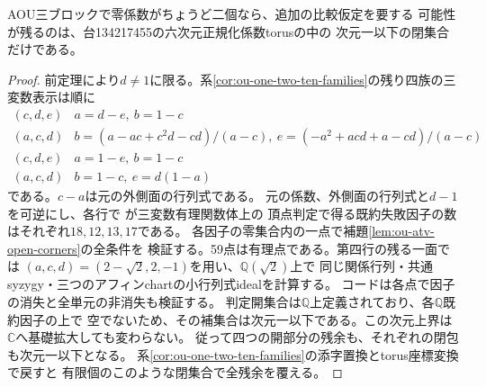 \begin{corollary}[二零台の残余は余次元五以上]
\label{cor:ou-two-zero-codim-five}
AOU三ブロックで零係数がちょうど二個なら、追加の比較仮定を要する
可能性が残るのは、台134217455の六次元正規化係数torusの中の
次元一以下の閉集合だけである。
\end{corollary}
\begin{proof}
前定理により$d\ne1$に限る。系\ref{cor:ou-one-two-ten-families}の残り四族の三変数表示は順に
\[
\begin{array}{c|l}
(c,d,e)&a=d-e,\ b=1-c\\
(a,c,d)&
 b=(a-ac+c^2d-cd)/(a-c),\ e=(-a^2+acd+a-cd)/(a-c)\\
(c,d,e)&a=1-e,\ b=1-c\\
(a,c,d)&b=1-c,\ e=d(1-a)
\end{array}
\]
である。$c-a$は元の外側面の行列式である。
元の係数、外側面の行列式と$d-1$を可逆にし、各行で
が三変数有理関数体上の
頂点判定で得る既約失敗因子の数はそれぞれ$18,12,13,17$である。
各因子の零集合内の一点で補題\ref{lem:ou-atv-open-corners}の全条件を
検証する。59点は有理点である。第四行の残る一面では
$(a,c,d)=(2-\sqrt2,2,-1)$を用い、$\mathbb Q(\sqrt2)$上で
同じ関係行列・共通syzygy・三つのアフィンchartの小行列式idealを計算する。
コードは各点で因子の消失と全単元の非消失も検証する。
判定開集合は$\mathbb Q$上定義されており、各$\mathbb Q$既約因子の上で
空でないため、その補集合は次元一以下である。この次元上界は
$\mathbb C$へ基礎拡大しても変わらない。
従って四つの開部分の残余も、それぞれの閉包も次元一以下となる。
系\ref{cor:ou-one-two-ten-families}の添字置換とtorus座標変換で戻すと
有限個のこのような閉集合で全残余を覆える。
\end{proof}

